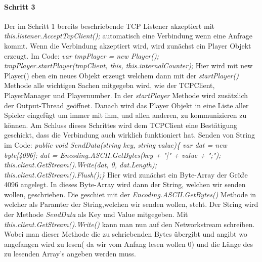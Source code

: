 \paragraph{Schritt 3}
Der im Schritt 1 bereits beschriebende TCP Listener akzeptiert mit \textit{this.listener.AcceptTcpClient();} automatisch eine Verbindung wenn eine Anfrage kommt.
Wenn die Verbindung akzeptiert wird, wird zunächst ein Player Objekt erzeugt. Im Code: 
\newline 
\textit{var tmpPlayer = new Player(); \newline
tmpPlayer.startPlayer(tmpClient, this, this.internalCounter);}
\newline
Hier wird mit new Player() eben ein neues Objekt erzeugt welchem dann mit der \textit{startPlayer()} Methode alle wichtigen Sachen mitgegebn wird, wie der TCPClient, PlayerManager und Playernumber. In der \textit{startPlayer} Methode wird zusätzlich der Output-Thread geöffnet.
Danach wird das Player Objekt in eine Liste aller Spieler eingefügt um immer mit ihm, und allen anderen, zu kommunizieren zu können. Am Schluss dieses Schrittes wird dem TCPClient eine Bestätigung geschickt, dass die Verbindung auch wirklich funktioniert hat. Senden von String im Code:
\newline
\textit{
public void SendData(string key, string value)\{\newline
var dat = new byte[4096];\newline
dat = Encoding.ASCII.GetBytes(key + "|" + value + ";");\newline
this.client.GetStream().Write(dat, 0, dat.Length);\newline
this.client.GetStream().Flush();\newline \}
} \newline
Hier wird zunächst ein Byte-Array der Größe 4096 angelegt. In dieses Byte-Array wird dann der String, welchen wir senden wollen, geschrieben. 
Die geschiet mit der \textit{Encoding.ASCII.GetBytes()} Methode in welcher als Paramter der String,welchen wir senden wollen, steht. 
Der String wird der Methode \textit{SendData} als Key und Value mitgegeben. Mit \textit{this.client.GetStream().Write()} kann man nun auf den Networkstream schreiben.
Wobei man dieser Methode die zu schriebenden Bytes übergibt und angibt wo angefangen wird zu lesen( da wir vom Anfang lesen wollen 0) und die Länge des zu lesenden Array's angeben werden muss.

